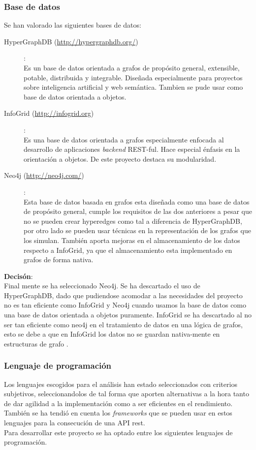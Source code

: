 \documentclass[12pt]{article} %
\begin{document}
\subsubsection{Base de datos}
Se han valorado las siguientes bases de datos:

\begin{description}
\item[HyperGraphDB (\url{http://hypergraphdb.org/})]:
\\Es un base de datos orientada a grafos de propósito general, extensible, potable, distribuida y integrable. Diseñada especialmente para proyectos sobre inteligencia artificial y web semántica. Tambien se pude usar como base de datos orientada a objetos.
\item[InfoGrid (\url{http://infogrid.org})]:
\\Es una base de datos orientada a grafos especialmente enfocada al desarrollo de aplicaciones \textit{backend} REST-ful. Hace especial énfasis en la orientación a objetos. De este proyecto destaca su modularidad. 
\item[Neo4j (\url{http://neo4j.com/})]:
\\Esta base de datos basada en grafos esta diseñada como una base de datos de propósito general, cumple los requisitos de las dos anteriores a pesar que no se pueden crear hyperedges como tal a diferencia de HyperGraphDB, por otro lado se pueden usar técnicas en la representación de los grafos que los simulan. También aporta mejoras en el almacenamiento de los datos respecto a InfoGrid, ya que el almacenamiento esta implementado en grafos de forma nativa.
\end{description}

\textbf{Decisón}:\\
Final mente se ha seleccionado Neo4j. Se ha descartado el uso de HyperGraphDB, dado que pudiendose acomodar a las necesidades del proyecto no es tan eficiente como InfoGrid y Neo4j cuando usamos la base de datos como una base de datos orientada a objetos puramente.
InfoGrid se ha descartado al no ser tan eficiente como neo4j en el tratamiento de datos en una lógica de grafos, esto se debe a que en InfoGrid los datos no se guardan nativa-mente en estructuras de grafo \cite{neo4jvsinfogrid}.

\subsubsection{Lenguaje de programación}
Los lenguajes escogidos para el análisis han estado seleccionados con criterios subjetivos, seleccionandolos de tal forma que aporten alternativas a la hora tanto de dar agilidad a la implementación como a ser eficientes en el rendimiento. También se ha tendió en cuenta los \textit{frameworks} que se pueden usar en estos lenguajes para la consecución de una API rest.\\Para desarrollar este proyecto se ha optado entre los siguientes lenguajes de programación.
\end{document}

